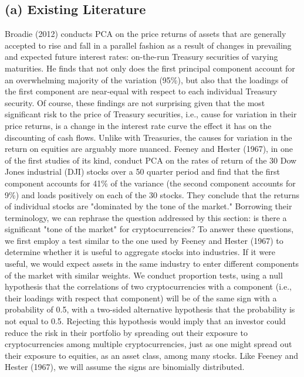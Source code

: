 \documentclass[12pt,twoside]{article}
\begin{document}
\subsection*{(a) Existing Literature}
Broadie (2012) conducts PCA on the price returns of assets that are generally accepted to rise and fall in a parallel fashion as a result of changes in prevailing and expected future interest rates: on-the-run Treasury securities of varying maturities. He finds that not only does the first principal component account for an overwhelming majority of the variation (95\%), but also that the loadings of the first component are near-equal with respect to each individual Treasury security. Of course, these findings are not surprising given that the most significant risk to the price of Treasury securities, i.e., cause for variation in their price returns, is a change in the interest rate curve the effect it has on the discounting of cash flows. Unlike with Treasuries, the causes for variation in the return on equities are arguably more nuanced. Feeney and Hester (1967), in one of the first studies of its kind, conduct PCA on the rates of return of the 30 Dow Jones industrial (DJI) stocks over a 50 quarter period and find that the first component accounts for 41\% of the variance (the second component accounts for 9\%) and loads positively on each of the 30 stocks. They conclude that the returns of individual stocks are "dominated by the tone of the market." Borrowing their terminology, we can rephrase the question addressed by this section: is there a significant "tone of the market" for cryptocurrencies?
\bigbreak
To answer these questions, we first employ a test similar to the one used by Feeney and Hester (1967) to determine whether it is useful to aggregate stocks into industries. If it were useful, we would expect assets in the same industry to enter different components of the market with similar weights. We conduct proportion tests, using a null hypothesis that the correlations of two cryptocurrencies with a component (i.e., their loadings with respect that component) will be of the same sign with a probability of 0.5, with a two-sided alternative hypothesis that the probability is not equal to 0.5. Rejecting this hypothesis would imply that an investor could reduce the risk in their portfolio by spreading out their exposure to cryptocurrencies among multiple cryptocurrencies, just as one might spread out their exposure to equities, as an asset class, among many stocks. Like Feeney and Hester (1967), we will assume the signs are binomially distributed.
\end{document}
